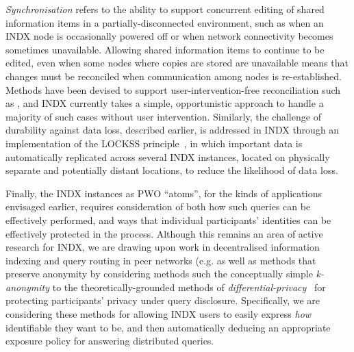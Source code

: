 \documentclass{acm_proc_article-sp}
\begin{document}
\emph{Synchronisation} refers to the ability to support concurrent editing of shared information items in a partially-disconnected environment, such as when an INDX node is occasionally powered off or when network connectivity becomes sometimes unavailable.  Allowing shared information items to continue to be edited, even when some nodes where copies are stored are unavailable means that changes must be reconciled when communication among nodes is re-established.  Methods have been devised to support user-intervention-free reconciliation such as \cite{sun1998operational}, and INDX currently takes a simple, opportunistic approach to handle a majority of such cases without user intervention.  Similarly, the challenge of durability against data loss, described earlier, is addressed in INDX through an implementation of the LOCKSS principle~\cite{reich2001lockss}, in which important data is automatically replicated across several INDX instances, located on physically separate and potentially distant locations, to reduce the likelihood of data loss.

Finally, the INDX instances as PWO ``atoms'', for the kinds of applications envisaged earlier, requires consideration of both how such queries can be effectively performed, and ways that individual participants' identities can be effectively protected in the process.  Although this remains an area of active research for INDX, we are drawing upon work in decentralised information indexing and query routing in peer networks (e.g. \cite{cudre2007gridvine,tatarinov2003piazza} as well as methods that preserve anonymity by considering methods such the conceptually simple \emph{k-anonymity} \cite{sweeney2002k} to the theoretically-grounded methods of \emph{differential-privacy}~\cite{dwork2006differential} for protecting participants' privacy under query disclosure. Specifically, we are considering these methods for allowing INDX users to easily express \emph{how} identifiable they want to be, and then automatically deducing an appropriate exposure policy for answering distributed queries.  


\end{document}
